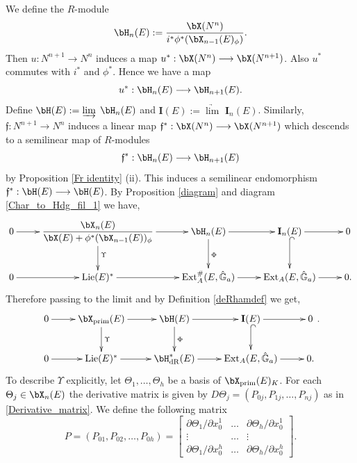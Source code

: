 \documentclass{amsart}
\numberwithin {equation}{section}
\begin{document}
 We define the $R$-module $${\bH}_{n}(E):=\dfrac{{\bX}(N^{n})}{i^{*}\phi^{*}({\bX}_{n-1}(E)_{\phi})}.$$
Then $u:N^{n+1}\longrightarrow N^{n}$ induces a map $u^{*}:{\bX}(N^{n})\longrightarrow {\bX}(N^{n+1})$. Also $u^{*}$ commutes with $i^{*}$ and $\phi^{*}$. Hence we have a map $$u^{*}:{\bH}_{n}(E)\longrightarrow {\bH}_{n+1}(E).$$
Define $ {\bH}(E):=\underrightarrow{\lim}$ ${\bH}_{n}(E) $ and $ \mathbf{I}(E):=\underrightarrow{\lim}$ $\mathbf{I}_{n}(E) $.
Similarly, $\mathfrak{f}:N^{n+1}\longrightarrow N^{n}$ induces a linear map $\mathfrak{f}^{*}:{\bX}(N^{n})\longrightarrow {\bX}(N^{n+1})$ which descends to a semilinear map of $R$-modules $$\mathfrak{f}^{*}:{\bH}_{n}(E)\longrightarrow {\bH}_{n+1}(E)$$ by Proposition \eqref{Fr identity} (ii). This induces a semilinear endomorphism $\mathfrak{f}^{*}:{\bH}(E)\longrightarrow {\bH}(E)$. By Proposition \ref{diagram} and  diagram \eqref{Char_to_Hdg_fil_1} we have,
$${
\xymatrix{
0  \ar[r] &\dfrac{{\bX}_{n}(E)}{\bX(E)+\phi^{*}({\bX}_{n-1}(E))_{\phi}}\ar[d]^\Upsilon \ar[r] &{\bH}_{n}(E)\ar[d]^\Phi \ar[r] &\mathbf{I}_{n}(E)\ar@{^{(}->}[d] \ar[r]&0 \\
0 \ar[r] &\mathrm{Lie} (E)^{*} \ar[r] &\mathrm{Ext}^{\#}_{A}(E,\hat{\mathbb{G}}_{a}) \ar[r] &\mathrm{Ext}_{A}(E,\hat{\mathbb{G}}_{a}) \ar[r] &0.}
}$$
Therefore passing to the limit and by Definition \ref{deRhamdef} we get,
\label{map to_deRham}
\begin{equation} 
{\xymatrix{
0  \ar[r] &{\bX}_{\mathrm{prim}}(E)\ar[d]^\Upsilon \ar[r] &{\bH}(E)\ar[d]^\Phi \ar[r] &\mathbf{I}(E)\ar@{^{(}->}[d] \ar[r]&0 \\
0 \ar[r] &\mathrm{Lie} (E)^{*} \ar[r] &\bH^{*}_{\mathrm{dR}}({E}) \ar[r] &\mathrm{Ext}_{A}(E,\hat{\mathbb{G}}_{a}) \ar[r] &0.}
}.
\end{equation}
To describe $\Upsilon$ explicitly, let  $\Theta_{1},\ldots,\Theta_{h}$ be a basis of ${\bX}_{\mathrm{prim}}(E)_{K}$. For each $\Theta_{j}\in {\bX}_{n}(E)$ the derivative  matrix is given by  $D\Theta_{j}=(P_{0j},P_{1j},\ldots, P_{nj})$ as in \eqref{Derivative_matrix}. We define the following matrix 
\begin{equation*}
P=(P_{01},P_{02},\ldots,P_{0h})=\begin{bmatrix}
{\partial \Theta_{1}}/{\partial x^{1}_{0}} &  \dots &  {\partial \Theta_{h}}/{\partial x^{1}_{0}} \\

    \vdots & \dots & \vdots \\
{\partial \Theta_{1}}/{\partial x^{h}_{0}} & \dots & {\partial \Theta_{h}}/{\partial x^{h}_{0}}  
\end{bmatrix}.
\end{equation*}
\end{document}
